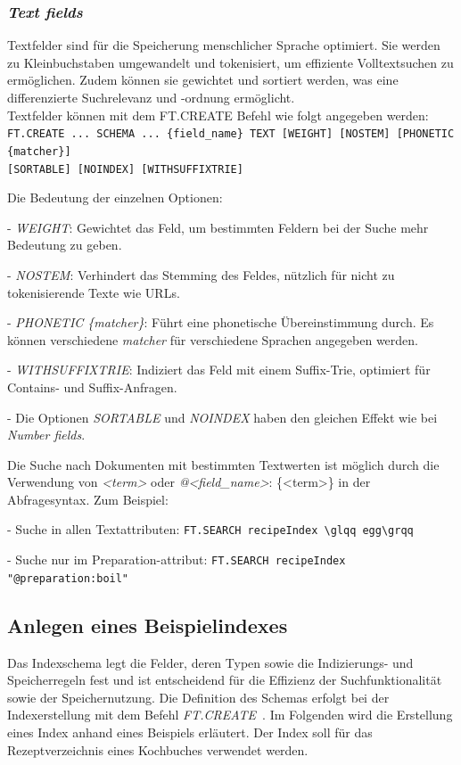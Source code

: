 \subsubsection{{\emph{Text fields}}}
Textfelder sind für die Speicherung menschlicher Sprache optimiert. Sie werden zu Kleinbuchstaben umgewandelt und tokenisiert, um effiziente Voll\-text\-su\-chen zu er\-mög\-li\-chen. Zu\-dem kön\-nen sie ge\-wich\-tet und sor\-tiert wer\-den, was ei\-ne dif\-fe\-ren\-zier\-te Such\-re\-le\-vanz und -ordnung ermöglicht.\\
Textfelder können mit dem FT.CREATE Befehl wie folgt angegeben werden:\\
\lstinline|FT.CREATE ... SCHEMA ... {field_name} TEXT [WEIGHT] [NOSTEM] [PHONETIC {matcher}]|\\ \lstinline|[SORTABLE] [NOINDEX] [WITHSUFFIXTRIE]|

Die Bedeutung der einzelnen Optionen:

- \emph{WEIGHT}: Gewichtet das Feld, um bestimmten Feldern bei der Suche mehr Bedeutung zu geben.

- \emph{NOSTEM}: Verhindert das Stemming des Feldes, nützlich für nicht zu tokenisierende Texte wie URLs.

- \emph{PHONETIC \{matcher\}}: Führt eine phonetische Übereinstimmung durch. Es können verschiedene \emph{matcher} für verschiedene Sprachen angegeben werden.

- \emph{WITHSUFFIXTRIE}: Indiziert das Feld mit einem Suffix-Trie, optimiert für Contains- und Suffix-Anfragen.

- Die Optionen \emph{SORTABLE} und \emph{NOINDEX} haben den gleichen Effekt wie bei \emph{Number fields}.

Die Suche nach Dokumenten mit bestimmten Textwerten ist möglich durch die Verwendung von \emph{<term>} oder \emph{@<field\_name>}:
\{<term>\} in der Abfragesyntax. Zum Beispiel:

- Suche in allen Textattributen:
 \lstinline|FT.SEARCH recipeIndex \glqq egg\grqq|

- Suche nur im Preparation-attribut:
 \lstinline|FT.SEARCH recipeIndex "@preparation:boil"|




\subsection{Anlegen eines Beispielindexes}
Das Indexschema legt die Felder, deren Typen sowie die Indizierungs- und Speicherregeln fest und ist entscheidend für die Effizienz der Suchfunktionalität sowie der Speichernutzung.
Die Definition des Schemas erfolgt bei der Indexerstellung mit dem Befehl \emph{FT.CREATE}~\cite{redis_ltd_ftcreate_nodate}.
Im Folgenden wird die Erstellung eines Index anhand eines Beispiels erläutert.
Der Index soll für das Rezeptverzeichnis eines Kochbuches verwendet werden.


